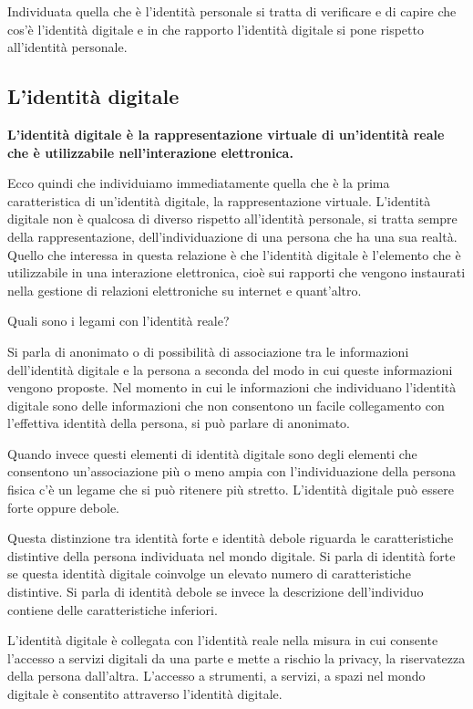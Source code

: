 Individuata quella che è l'identità personale si tratta di verificare e di capire che cos'è l'identità digitale e in che rapporto l'identità digitale si pone rispetto all'identità personale. 

\subsection{L'identità digitale}

\textbf{L'identità digitale è la rappresentazione virtuale di un'identità reale che è utilizzabile nell'interazione elettronica.} 

Ecco quindi che individuiamo immediatamente quella che è la prima caratteristica di un'identità digitale, la rappresentazione virtuale. L'identità digitale non è qualcosa di diverso rispetto all'identità personale, si tratta sempre della rappresentazione, dell'individuazione di una persona che ha una sua realtà. Quello che interessa in questa relazione è che l'identità digitale è l'elemento che è utilizzabile in una interazione elettronica, cioè sui rapporti che vengono instaurati nella gestione di relazioni elettroniche su internet e quant'altro.

Quali sono i legami con l'identità reale? 

Si parla di anonimato o di possibilità di associazione tra le informazioni dell'identità digitale e la persona a seconda del modo in cui queste informazioni vengono proposte. Nel momento in cui le informazioni che individuano l'identità digitale sono delle informazioni che non consentono un facile collegamento con l'effettiva identità della persona, si può parlare di anonimato.

Quando invece questi elementi di identità digitale sono degli elementi che consentono un'associazione più o meno ampia con l'individuazione della persona fisica c'è un legame che si può ritenere più stretto.
L'identità digitale può essere forte oppure debole.

Questa distinzione tra identità forte e identità debole riguarda le caratteristiche distintive della persona individuata nel mondo digitale. Si parla di identità forte se questa identità digitale coinvolge un elevato numero di caratteristiche distintive. Si parla di identità debole se invece la descrizione dell'individuo contiene delle caratteristiche inferiori.

L'identità digitale è collegata con l'identità reale nella misura in cui consente l'accesso a servizi digitali da una parte e mette a rischio la privacy, la riservatezza della persona dall'altra.
L'accesso a strumenti, a servizi, a spazi nel mondo digitale è consentito attraverso l'identità digitale.

